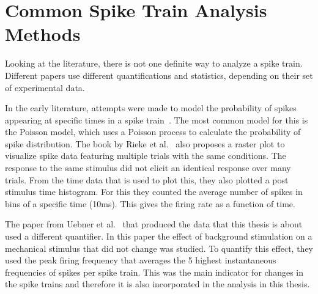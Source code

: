 \section{Common Spike Train Analysis Methods}
Looking at the literature, there is not one definite way to analyze a spike train. Different papers use different quantifications and statistics, depending on their set of experimental data.

In the early literature, attempts were made to model the probability of spikes appearing at specific times in a spike train~\cite{spikeGeneral}. The most common model for this is the Poisson model, which uses a Poisson process to calculate the probability of spike distribution.
The book by Rieke et al.~\cite{rieke1999spikes} also proposes a raster plot to visualize spike data featuring multiple trials with the same conditions. The response to the same stimulus did not elicit an identical response over many trials. From the time data that is used to plot this, they also plotted a post stimulus time histogram. For this they counted the average number of spikes in bins of a specific time (10ms). This gives the firing rate as a function of time.

The paper from Uebner et al.~\cite{roberto} that produced the data that this thesis is about used a different quantifier. In this paper the effect of background stimulation on a mechanical stimulus that did not change was studied. To quantify this effect, they used the peak firing frequency that averages the 5 highest instantaneous frequencies of spikes per spike train. This was the main indicator for changes in the spike trains and therefore it is also incorporated in the analysis in this thesis.


